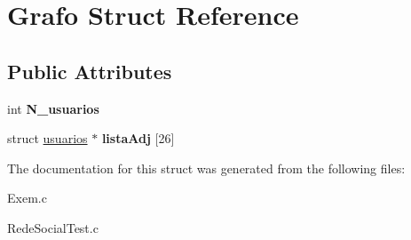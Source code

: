 \hypertarget{structGrafo}{}\section{Grafo Struct Reference}
\label{structGrafo}
\subsection*{Public Attributes}
\begin{DoxyCompactItemize}
\item 
\mbox{\label{structGrafo_afe888371c5227286e70468b88bf44cb1}} 
int {\bfseries N\+\_\+usuarios}
\item 
\mbox{\label{structGrafo_aa8aa3f2adaaf254e3a964d0041b31463}} 
struct \hyperlink{structusuarios}{usuarios} $\ast$ {\bfseries lista\+Adj} \mbox{[}26\mbox{]}
\end{DoxyCompactItemize}


The documentation for this struct was generated from the following files\+:\begin{DoxyCompactItemize}
\item 
Exem.\+c\item 
Rede\+Social\+Test.\+c\end{DoxyCompactItemize}
